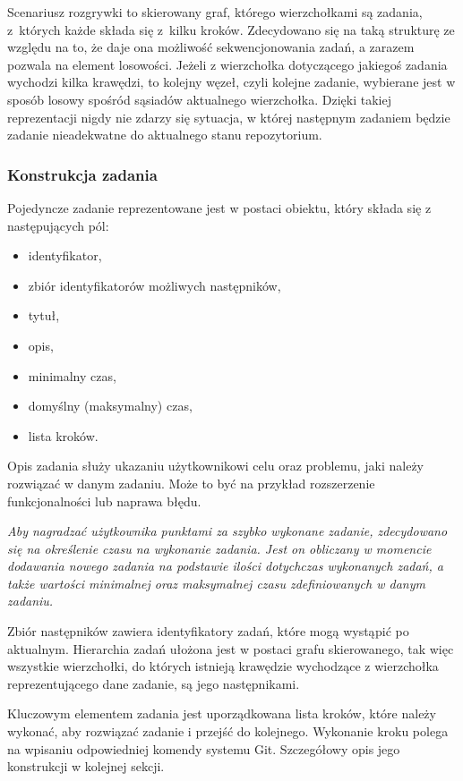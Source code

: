 \documentclass[11pt,a4paper,polish,thesis]{dcsbook}
\begin{document}
	Scenariusz rozgrywki to skierowany graf, którego wierzchołkami są zadania, z~których każde składa się z~kilku kroków. Zdecydowano się na taką strukturę ze względu na to, że daje ona możliwość sekwencjonowania zadań, a zarazem pozwala na element losowości. Jeżeli z wierzchołka dotyczącego jakiegoś zadania wychodzi kilka krawędzi, to kolejny węzeł, czyli kolejne zadanie, wybierane jest w sposób losowy spośród sąsiadów aktualnego wierzchołka. Dzięki takiej reprezentacji nigdy nie zdarzy się sytuacja, w której następnym zadaniem będzie zadanie nieadekwatne do aktualnego stanu repozytorium.

	\subsubsection{Konstrukcja zadania}
	Pojedyncze zadanie reprezentowane jest w postaci obiektu, który składa się z następujących pól:
	\begin{itemize}
	\item identyfikator,
	\item zbiór identyfikatorów możliwych następników,
	\item tytuł,
	\item opis,
	\item minimalny czas,
	\item domyślny (maksymalny) czas,
	\item lista kroków.	
	\end{itemize}
	
	Opis zadania służy ukazaniu użytkownikowi celu oraz problemu, jaki należy rozwiązać w danym zadaniu. Może to być na przykład rozszerzenie funkcjonalności lub naprawa błędu.
	
	\textit{Aby nagradzać użytkownika punktami za szybko wykonane zadanie, zdecydowano się na określenie czasu na wykonanie zadania. Jest on obliczany w momencie dodawania nowego zadania na podstawie ilości dotychczas wykonanych zadań, a także wartości minimalnej oraz maksymalnej czasu zdefiniowanych w danym zadaniu.}
	
	Zbiór następników zawiera identyfikatory zadań, które mogą wystąpić po aktualnym. Hierarchia zadań ułożona jest w postaci grafu skierowanego, tak więc wszystkie wierzchołki, do których istnieją krawędzie wychodzące z wierzchołka reprezentującego dane zadanie, są jego następnikami. 
	
	Kluczowym elementem zadania jest uporządkowana lista kroków, które należy wykonać, aby rozwiązać zadanie i przejść do kolejnego. Wykonanie kroku polega na wpisaniu odpowiedniej komendy systemu Git. Szczegółowy opis jego konstrukcji w kolejnej sekcji.
\end{document}

